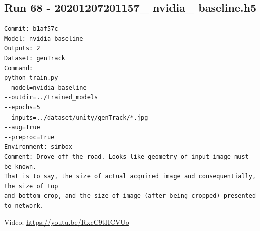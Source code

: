 \subsection{Run 68 - 20201207201157\_ nvidia\_ baseline.h5 }
\label{app_res:68}
\begin{verbatim}
Commit: b1af57c
Model: nvidia_baseline
Outputs: 2
Dataset: genTrack
Command:
python train.py
--model=nvidia_baseline
--outdir=../trained_models
--epochs=5
--inputs=../dataset/unity/genTrack/*.jpg
--aug=True
--preproc=True
Environment: simbox
Comment: Drove off the road. Looks like geometry of input image must be known.  
That is to say, the size of actual acquired image and consequentially, the size of top 
and bottom crop, and the size of image (after being cropped) presented to network.
\end{verbatim}
Video: \url{https://youtu.be/RxcC9tHCVUo}



